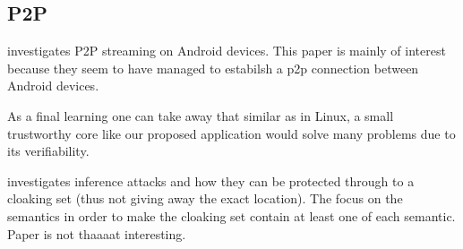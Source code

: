 \subsection{P2P}
\parencite{eittenberger2012rapidstream} investigates P2P streaming on Android devices. This paper is mainly of interest because they seem to have managed to estabilsh a p2p connection between Android devices.

As a final learning one can take away that similar as in Linux, a small trustworthy core like our proposed application would solve many problems due to its verifiability. 

\parencite{xu2018location} investigates inference attacks and how they can be protected through to a cloaking set (thus not giving away the exact location). The focus on the semantics in order to make the cloaking set contain at least one of each semantic. Paper is not thaaaat interesting.